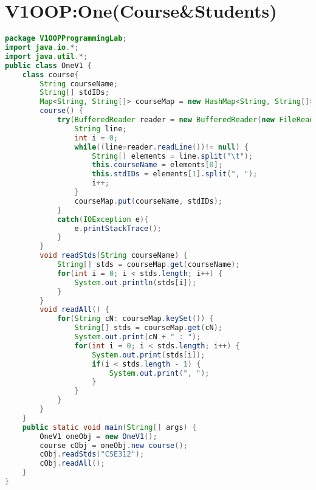 \documentclass{article}
\begin{document}
\section{V1OOP:One(Course\&Students)}
\begin{lstlisting}[language=Java, caption=V1OOP:One(Course\&Students)]
package V1OOPProgrammingLab;
import java.io.*;
import java.util.*;
public class OneV1 {
	class course{
		String courseName;
		String[] stdIDs;
		Map<String, String[]> courseMap = new HashMap<String, String[]>();
		course() {
			try(BufferedReader reader = new BufferedReader(new FileReader("D:\\Academic-Coding\\2nd-Semester\\OOP\\eclipse-workplace\\LabExamPractice\\src\\V1OOPProgrammingLab\\course.txt"))){
				String line;
				int i = 0;
				while((line=reader.readLine())!= null) {
					String[] elements = line.split("\t");
					this.courseName = elements[0];
					this.stdIDs = elements[1].split(", ");
					i++;
				}
				courseMap.put(courseName, stdIDs);
			}
			catch(IOException e){
				e.printStackTrace();
			}
		}
		void readStds(String courseName) {
			String[] stds = courseMap.get(courseName);
			for(int i = 0; i < stds.length; i++) {
				System.out.println(stds[i]);
			}
		}
		void readAll() {
			for(String cN: courseMap.keySet()) {
				String[] stds = courseMap.get(cN);
				System.out.print(cN + " : ");
				for(int i = 0; i < stds.length; i++) {
					System.out.print(stds[i]);
					if(i < stds.length - 1) {
						System.out.print(", ");
					}
				}
			}
		}
	}	
	public static void main(String[] args) {
		OneV1 oneObj = new OneV1();
		course cObj = oneObj.new course();
		cObj.readStds("CSE312");
		cObj.readAll();
	}
}

\end{lstlisting}
\end{document}
